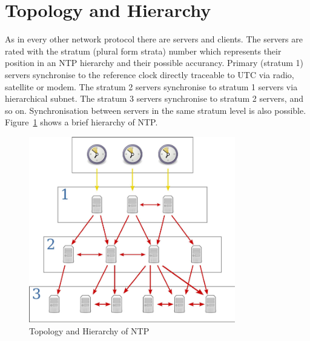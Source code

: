 
\section{Topology and Hierarchy}
As in every other network protocol there are servers and clients.
The servers are rated with the stratum (plural form strata) number which represents their position
in an NTP hierarchy and their possible accurancy.
Primary (stratum 1) servers synchronise to the reference clock directly traceable to UTC via
radio, satellite or modem.
The stratum 2 servers synchronise to stratum 1
servers via hierarchical subnet.
The stratum 3 servers synchronise to stratum 2 servers, and so on.
Synchronisation between servers in the same stratum level is also possible.
Figure~\ref{fig:ntp-hierarchy} shows a brief hierarchy of NTP.
\begin{figure}
  \centering
  \includegraphics[width=9cm,keepaspectratio]{fig/Network_Time_Protocol_servers_and_clients.pdf}
  \caption{Topology and Hierarchy of NTP}
  \label{fig:ntp-hierarchy}
  \bigskip
\end{figure}

